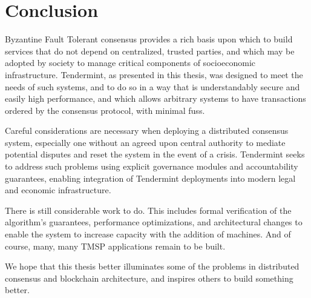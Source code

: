 \chapter{Conclusion}

Byzantine Fault Tolerant consensus provides a rich basis upon which to build services 
that do not depend on centralized, trusted parties, and which may be adopted by society
to manage critical components of socioeconomic infrastructure.
Tendermint, as presented in this thesis, was designed to meet the needs of such systems,
and to do so in a way that is understandably secure and easily high performance,
and which allows arbitrary systems to have transactions ordered by the consensus protocol,
with minimal fuss.

Careful considerations are necessary when deploying a distributed consensus system,
especially one without an agreed upon central authority to mediate potential disputes and reset the system in the event of a crisis.
Tendermint seeks to address such problems using explicit governance modules and accountability guarantees,
enabling integration of Tendermint deployments into modern legal and economic infrastructure.

There is still considerable work to do. This includes formal verification of the algorithm's guarantees, 
performance optimizations, and architectural changes to enable the system to increase capacity with the addition of machines.
And of course, many, many TMSP applications remain to be built.

We hope that this thesis better illuminates some of the problems in distributed consensus and blockchain architecture,
and inspires others to build something better.
